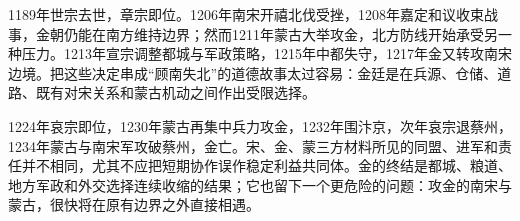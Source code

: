 1189年世宗去世，章宗即位。1206年南宋开禧北伐受挫，1208年嘉定和议收束战事，金朝仍能在南方维持边界；然而1211年蒙古大举攻金，北方防线开始承受另一种压力。1213年宣宗调整都城与军政策略，1215年中都失守，1217年金又转攻南宋边境。把这些决定串成“顾南失北”的道德故事太过容易：金廷是在兵源、仓储、道路、既有对宋关系和蒙古机动之间作出受限选择。

1224年哀宗即位，1230年蒙古再集中兵力攻金，1232年围汴京，次年哀宗退蔡州，1234年蒙古与南宋军攻破蔡州，金亡。宋、金、蒙三方材料所见的同盟、进军和责任并不相同，尤其不应把短期协作误作稳定利益共同体。金的终结是都城、粮道、地方军政和外交选择连续收缩的结果；它也留下一个更危险的问题：攻金的南宋与蒙古，很快将在原有边界之外直接相遇。



